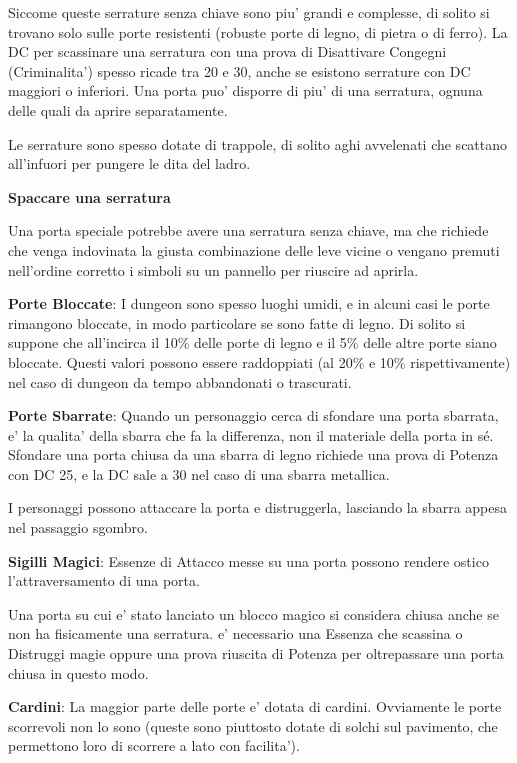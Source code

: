 \documentclass[a4paper,11pt,twoside,openany]{dndbook}
\begin{document}
Siccome queste serrature senza chiave sono piu' grandi e complesse, di solito si trovano solo sulle porte resistenti (robuste porte di legno, di pietra o di ferro). 
La DC per scassinare una serratura con una prova di Disattivare Congegni (Criminalita') spesso ricade tra 20 e 30, anche se esistono serrature con DC maggiori o inferiori. Una porta puo' disporre di piu' di una serratura, ognuna delle quali da aprire separatamente.

Le serrature sono spesso dotate di trappole, di solito aghi avvelenati che scattano all'infuori per pungere le dita del ladro.

\textbf{Spaccare una serratura}

Una porta speciale potrebbe avere una serratura senza chiave, ma che richiede che venga indovinata la giusta combinazione delle leve vicine o vengano premuti nell'ordine corretto i simboli su un pannello per riuscire ad aprirla.

\textbf{Porte Bloccate}: I dungeon sono spesso luoghi umidi, e in alcuni casi le porte rimangono bloccate, in modo particolare se sono fatte di legno. Di solito si suppone che all'incirca il 10\% delle porte di legno e il 5\% delle altre porte siano bloccate. Questi valori possono essere raddoppiati (al 20\% e 10\% rispettivamente) nel caso di dungeon da tempo abbandonati o trascurati.

\textbf{Porte Sbarrate}: Quando un personaggio cerca di sfondare una porta sbarrata, e' la qualita' della sbarra che fa la differenza, non il materiale della porta in sé. Sfondare una porta chiusa da una sbarra di legno richiede una prova di Potenza con DC 25, e la DC sale a 30 nel caso di una sbarra metallica.

I personaggi possono attaccare la porta e distruggerla, lasciando la sbarra appesa nel passaggio sgombro.

\textbf{Sigilli Magici}: Essenze di Attacco messe su una porta possono rendere ostico l'attraversamento di una porta.

Una porta su cui e' stato lanciato un blocco magico si considera chiusa anche se non ha fisicamente una serratura. e' necessario una Essenza che scassina o Distruggi magie oppure una prova riuscita di Potenza per oltrepassare una porta chiusa in questo modo.

\textbf{Cardini}: La maggior parte delle porte e' dotata di cardini. Ovviamente le porte scorrevoli non lo sono (queste sono piuttosto dotate di solchi sul pavimento, che permettono loro di scorrere a lato con facilita').
\end{document}
